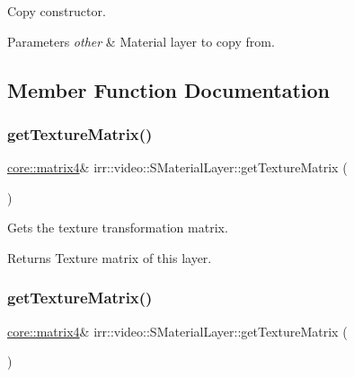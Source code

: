 Copy constructor. 


\begin{DoxyParams}{Parameters}
{\em other} & Material layer to copy from. \\
\hline
\end{DoxyParams}


\subsection{Member Function Documentation}
\mbox{\label{classirr_1_1video_1_1SMaterialLayer_aa8d7c025f5bb282537b8886c340dbe63}} 
\subsubsection{\texorpdfstring{get\+Texture\+Matrix()}{getTextureMatrix()}\hspace{0.1cm}{\footnotesize\ttfamily [1/4]}}
{\footnotesize\ttfamily \hyperlink{namespaceirr_1_1core_a4c9d4e29899535971052810954a14431}{core\+::matrix4}\& irr\+::video\+::\+S\+Material\+Layer\+::get\+Texture\+Matrix (\begin{DoxyParamCaption}{ }\end{DoxyParamCaption})\hspace{0.3cm}{\ttfamily [inline]}}



Gets the texture transformation matrix. 

\begin{DoxyReturn}{Returns}
Texture matrix of this layer. 
\end{DoxyReturn}
\mbox{\label{classirr_1_1video_1_1SMaterialLayer_aa8d7c025f5bb282537b8886c340dbe63}} 
\subsubsection{\texorpdfstring{get\+Texture\+Matrix()}{getTextureMatrix()}\hspace{0.1cm}{\footnotesize\ttfamily [2/4]}}
{\footnotesize\ttfamily \hyperlink{namespaceirr_1_1core_a4c9d4e29899535971052810954a14431}{core\+::matrix4}\& irr\+::video\+::\+S\+Material\+Layer\+::get\+Texture\+Matrix (\begin{DoxyParamCaption}{ }\end{DoxyParamCaption})\hspace{0.3cm}{\ttfamily [inline]}}




